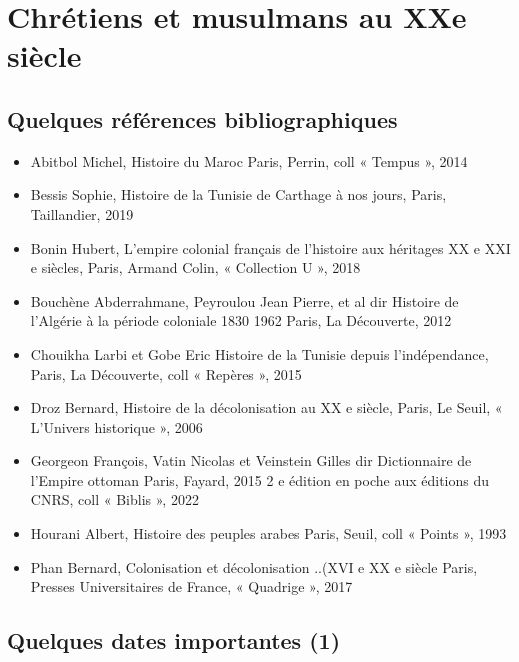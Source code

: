 \chapter{Chrétiens et musulmans au XXe siècle}


\section{Quelques références bibliographiques}

\begin{itemize}
    \item 
 
Abitbol
Michel, Histoire du Maroc Paris, Perrin, coll « Tempus », 2014
    \item 
Bessis
Sophie, Histoire de la Tunisie de Carthage à nos jours, Paris, Taillandier, 2019
    \item 
Bonin
Hubert, L'empire colonial français de l'histoire aux héritages XX e XXI e siècles, Paris, Armand Colin, « Collection U », 2018
    \item 
Bouchène
Abderrahmane, Peyroulou Jean Pierre, et al dir Histoire de l'Algérie à la période coloniale 1830 1962 Paris, La Découverte,
2012
    \item 
Chouikha
Larbi et Gobe Eric Histoire de la Tunisie depuis l’indépendance, Paris, La Découverte, coll « Repères », 2015
    \item 
Droz
Bernard, Histoire de la décolonisation au XX e siècle, Paris, Le Seuil, « L'Univers historique », 2006
    \item 
Georgeon
François, Vatin Nicolas et Veinstein Gilles dir Dictionnaire de l’Empire ottoman Paris, Fayard, 2015 2 e édition en poche aux
éditions du CNRS, coll « Biblis », 2022
    \item 
Hourani
Albert, Histoire des peuples arabes Paris, Seuil, coll « Points », 1993
    \item 
Phan
Bernard, Colonisation et décolonisation ..(XVI e XX e siècle Paris, Presses Universitaires de France, « Quadrige », 2017
\end{itemize}

\section{Quelques dates importantes (1)}

